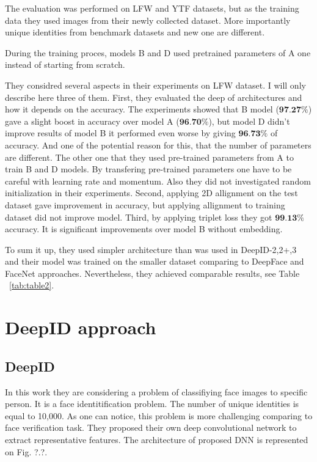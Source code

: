 \documentclass[paper=a4, fontsize=11pt]{scrartcl} %
\numberwithin{equation}{section} %
\numberwithin{figure}{section} %
\numberwithin{table}{section} %
\begin{document}
The evaluation was performed on LFW and YTF datasets, but as the training data they used images from their newly collected dataset. More importantly unique identities from benchmark datasets and new one are different.\par
During the training proces, models B and D used pretrained parameters of A one instead of starting from scratch. \par
They considred several aspects in their experiments on LFW dataset. I will only describe here three of them. First, they evaluated the deep of architectures and how it depends on the accuracy. The experiments showed that B model ($\textbf{97.27}\%$) gave a slight boost in accuracy over model A ($\textbf{96.70}\%$), but model D didn't improve results of model B it performed even worse by giving $\textbf{96.73}\%$ of accuracy. And one of the potential reason for this, that the number of parameters are different. The other one that they used pre-trained parameters from A to train B and D models. By transfering pre-trained parameters one have to be careful with learning rate and momentum. Also they did not investigated random initialization in their experiments. Second, applying 2D allignment on the test dataset gave improvement in accuracy, but applying allignment to training dataset did not improve model. Third, by applying triplet loss they got $\textbf{99.13\%}$ accuracy. It is significant improvements over model B without embedding. \par
To sum it up, they used simpler architecture than was used in DeepID-2,2+,3 \cite{sun2014deep, sun2015deeply, sun2015deepid3} and their model was trained on the smaller dataset comparing to DeepFace and FaceNet approaches. Nevertheless, they achieved comparable results, see Table ~\ref{tab:table2}.


\section{DeepID approach}

\subsection{DeepID}

In this work \cite{sun2014deep} they are considering a problem of classifiying face images to specific person. It is a face identitification problem. The number of unique identities is equal to 10,000. As one can notice, this problem is more challenging comparing to face verification task. They proposed their own deep convolutional network to extract representative features. The architecture of proposed DNN is represented on Fig. ?.?.
\end{document}
